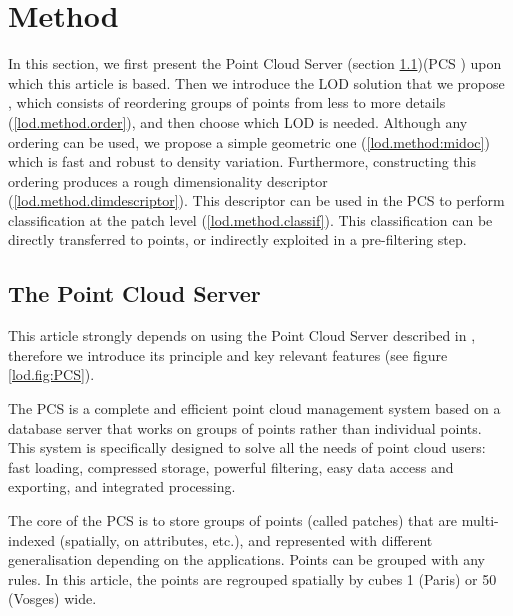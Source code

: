 

\section{Method}
	\label{lod.sec:method}
	
	In this section, we first present the Point Cloud Server (section \ref{lod.method.PCS})(PCS \cite{cura2015})
	upon which this article is based. Then we introduce the LOD solution that we propose 
	, which consists of reordering groups of points from less to more details (\ref{lod.method.order}), and then choose which LOD is needed.
	Although any ordering can be used, we propose a simple geometric one (\ref{lod.method:midoc}) which is fast and robust to density variation. 
	Furthermore, constructing this ordering produces a rough dimensionality descriptor (\ref{lod.method.dimdescriptor}). 
	This descriptor can be used in the PCS to perform classification at the patch level (\ref{lod.method.classif}). This classification can be directly transferred to points, or indirectly exploited in a pre-filtering step.
	
	\subsection{The Point Cloud Server}
	\label{lod.method.PCS}
		
		This article strongly depends on using the Point Cloud Server described in \cite{cura2015},
		therefore we introduce its principle and key relevant features (see figure \ref{lod.fig:PCS}).
		
		The PCS is a complete and efficient point cloud management system based on a database server that works on groups of points rather than individual points.
		This system is specifically designed to solve all the needs of point cloud users:
		fast loading, compressed storage, powerful filtering, easy data access and exporting, and integrated processing.
		
		The core of the PCS is to store groups of points (called patches) that are multi-indexed (spatially, on attributes, etc.), and represented with different generalisation depending on the applications.
		Points can be grouped with any rules.
		In this article, the points are regrouped spatially by cubes 1 \metre (Paris) or 50 \metre (Vosges) wide.
		
